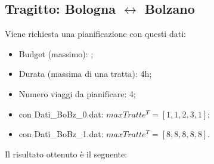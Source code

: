 \documentclass[main.tex]{subfiles}
\begin{document}
\subsection*{Tragitto: Bologna $\leftrightarrow$ Bolzano}
Viene richiesta una pianificazione con questi dati:
\begin{itemize}
    \item Budget (massimo): ;
    \item Durata (massima di una tratta): 4h;
    \item Numero viaggi da pianificare: 4;
    \item con Dati\_BoBz\_0.dat: $maxTratte^T = [1,1,2,3,1]$;
    \item con Dati\_BoBz\_1.dat: $maxTratte^T = [8,8,8,8,8]$.
\end{itemize}
Il risultato ottenuto è il seguente:
\end{document}
